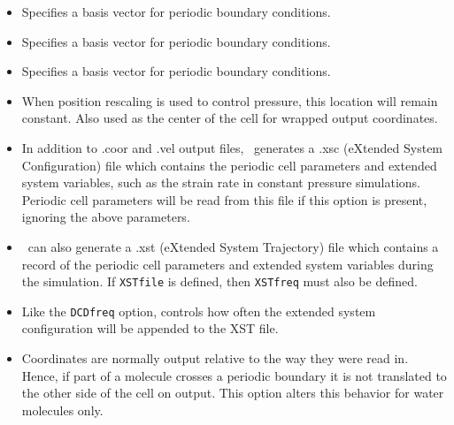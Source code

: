 \begin{itemize}

\item
{}
{Specifies a basis vector for periodic boundary conditions.}

\item
{}
{Specifies a basis vector for periodic boundary conditions.}

\item
{}
{Specifies a basis vector for periodic boundary conditions.}

\item
{}
{When position rescaling is used to control pressure, this location will remain constant.  Also used as the center of the cell for wrapped output coordinates.}

\item
{}
{In addition to .coor and .vel output files, \NAMD\ generates a .xsc (eXtended System Configuration) file which contains the periodic cell parameters and extended system variables, such as the strain rate in constant pressure simulations.  Periodic cell parameters will be read from this file if this option is present, ignoring the above parameters.}

\item
{}
{\NAMD\ can also generate a .xst (eXtended System Trajectory) file which contains a record of the periodic cell parameters and extended system variables during the simulation.  If {\tt XSTfile} is defined, then {\tt XSTfreq} must also be defined.}

\item
{}
{Like the {\tt DCDfreq} option, controls how often the extended system configuration will be appended to the XST file.}

\item
{}
{Coordinates are normally output relative to the way they were read in.  Hence, if part of a molecule crosses a periodic boundary it is not translated to the other side of the cell on output.  This option alters this behavior for water molecules only.}


\end{itemize}
